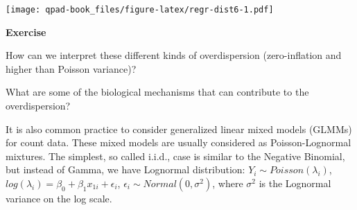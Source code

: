 \documentclass[12pt,]{book}
\newenvironment{Shaded}{\begin{snugshade}}{\end{snugshade}}
\newcommand{\DataTypeTok}[1]{\textcolor[rgb]{0.13,0.29,0.53}{#1}}
\newcommand{\DecValTok}[1]{\textcolor[rgb]{0.00,0.00,0.81}{#1}}
\newcommand{\FloatTok}[1]{\textcolor[rgb]{0.00,0.00,0.81}{#1}}
\newcommand{\KeywordTok}[1]{\textcolor[rgb]{0.13,0.29,0.53}{\textbf{#1}}}
\newcommand{\NormalTok}[1]{#1}
\newcommand{\OperatorTok}[1]{\textcolor[rgb]{0.81,0.36,0.00}{\textbf{#1}}}
\newcommand{\StringTok}[1]{\textcolor[rgb]{0.31,0.60,0.02}{#1}}
\let\BeginKnitrBlock\begin \let\EndKnitrBlock\end
\begin{document}
\begin{Shaded}
\end{Shaded}

\texttt{[image: qpad-book\_files/figure-latex/regr-dist6-1.pdf]}

\BeginKnitrBlock{rmdexercise}
\textbf{Exercise}

How can we interpret these different kinds of overdispersion (zero-inflation and higher than Poisson variance)?

What are some of the biological mechanisms that can contribute to the
overdispersion?
\EndKnitrBlock{rmdexercise}

It is also common practice to consider generalized linear mixed models (GLMMs)
for count data. These mixed models are usually considered as
Poisson-Lognormal mixtures. The simplest, so called i.i.d., case
is similar to the Negative Binomial, but instead of Gamma, we have Lognormal
distribution:
\(Y_i\sim Poisson(\lambda_i)\),
\(log(\lambda_i) = \beta_0+\beta_1 x_{1i}+\epsilon_i\),
\(\epsilon_i \sim Normal(0, \sigma^2)\),
where \(\sigma^2\) is the Lognormal variance on the log scale.
\end{document}
